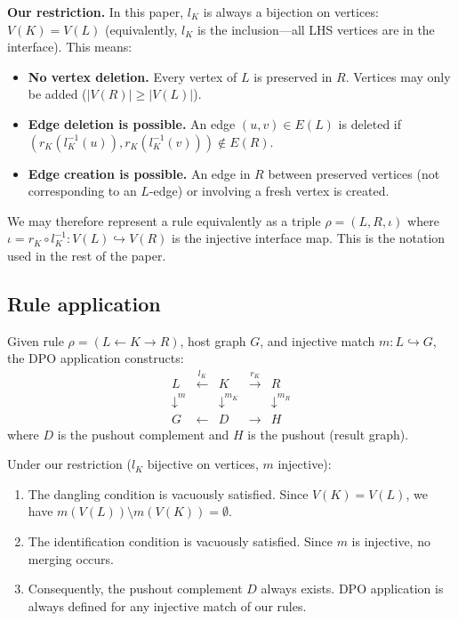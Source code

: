 \documentclass{../shared/primo}
\begin{document}
\textbf{Our restriction.} In this paper, $l_K$ is always a bijection on vertices: $V(K) = V(L)$ (equivalently, $l_K$ is the inclusion---all LHS vertices are in the interface). This means:
\begin{itemize}
\item \textbf{No vertex deletion.} Every vertex of $L$ is preserved in $R$. Vertices may only be added ($|V(R)| \geq |V(L)|$).
\item \textbf{Edge deletion is possible.} An edge $(u,v) \in E(L)$ is deleted if $(r_K(l_K^{-1}(u)), r_K(l_K^{-1}(v))) \notin E(R)$.
\item \textbf{Edge creation is possible.} An edge in $R$ between preserved vertices (not corresponding to an $L$-edge) or involving a fresh vertex is created.
\end{itemize}

We may therefore represent a rule equivalently as a triple $\rho = (L, R, \iota)$ where $\iota = r_K \circ l_K^{-1}: V(L) \hookrightarrow V(R)$ is the injective interface map. This is the notation used in the rest of the paper.

\subsection{Rule application}
\label{sec:application}

Given rule $\rho = (L \leftarrow K \rightarrow R)$, host graph $G$, and injective match $m: L \hookrightarrow G$, the DPO application constructs:
\[
\begin{array}{ccccc}
L & \xleftarrow{l_K} & K & \xrightarrow{r_K} & R \\
\downarrow^{m} & & \downarrow^{m_K} & & \downarrow^{m_R} \\
G & \xleftarrow{} & D & \xrightarrow{} & H
\end{array}
\]
where $D$ is the pushout complement and $H$ is the pushout (result graph).

\begin{proposition}\label{prop:vacuous}
Under our restriction ($l_K$ bijective on vertices, $m$ injective):
\begin{enumerate}
\item[\textup{(i)}] The dangling condition is vacuously satisfied. Since $V(K) = V(L)$, we have $m(V(L)) \setminus m(V(K)) = \emptyset$.
\item[\textup{(ii)}] The identification condition is vacuously satisfied. Since $m$ is injective, no merging occurs.
\item[\textup{(iii)}] Consequently, the pushout complement $D$ always exists. DPO application is always defined for any injective match of our rules.
\end{enumerate}
\end{proposition}
\end{document}

